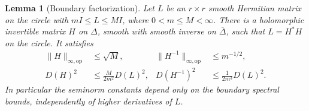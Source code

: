 \documentclass[11pt]{article}
\newtheorem{lemma}[theorem]{Lemma}
\theoremstyle{definition}
\theoremstyle{remark}
\numberwithin{equation}{section}
\begin{document}
\begin{lemma}[Boundary factorization]\label{lem:boundary-factorization}
Let $L$ be an $r\times r$ smooth Hermitian matrix on the circle with
$mI\le L\le MI$, where $0<m\le M<\infty$.  There is a holomorphic
invertible matrix $H$ on $\Delta$, smooth with smooth inverse on
$\overline\Delta$, such that $L=H^*H$ on the circle.  It satisfies
\begin{align}
 \|H\|_{\infty,\mathrm{op}}&\le\sqrt M,&
 \|H^{-1}\|_{\infty,\mathrm{op}}&\le m^{-1/2},\label{disc:factor-sup}\\
 D(H)^2&\le\frac{M}{2m^2}D(L)^2,&
 D(H^{-1})^2&\le\frac1{2m^3}D(L)^2.
 \label{disc:factor-seminorm}
\end{align}
In particular the seminorm constants depend only on the boundary
spectral bounds, independently of higher derivatives of $L$.
\end{lemma}
\end{document}
